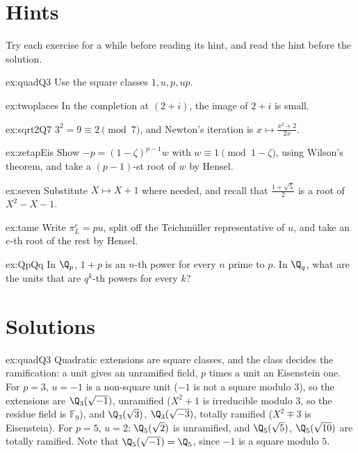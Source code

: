 \section{Hints}

Try each exercise for a while before reading its hint, and read the hint before the solution.

\begin{hint}{ex:quadQ3}
Use the square classes $1,u,p,up$.
\end{hint}
\begin{hint}{ex:twoplaces}
In the completion at $(2+i)$, the image of $2+i$ is small.
\end{hint}
\begin{hint}{ex:sqrt2Q7}
$3^2=9\equiv2\pmod 7$, and Newton's iteration is $x\mapsto\frac{x^2+2}{2x}$.
\end{hint}
\begin{hint}{ex:zetapEis}
Show $-p=(1-\zeta)^{p-1}w$ with $w\equiv1\pmod{1-\zeta}$, using Wilson's theorem, and take a $(p-1)$-st root of $w$ by Hensel.
\end{hint}
\begin{hint}{ex:seven}
Substitute $X\mapsto X+1$ where needed, and recall that $\frac{1+\sqrt5}2$ is a root of $X^2-X-1$.
\end{hint}
\begin{hint}{ex:tame}
Write $\pi_L^e=pu$, split off the Teichm\"uller representative of $u$, and take an $e$-th root of the rest by Hensel.
\end{hint}
\begin{hint}{ex:QpQq}
In $\Q_p$, $1+p$ is an $n$-th power for every $n$ prime to $p$. In $\Q_q$, what are the units that are $q^k$-th powers for every $k$?
\end{hint}

\section{Solutions}

\begin{solution}{ex:quadQ3}
\idea Quadratic extensions are square classes, and the class decides the ramification: a unit gives an unramified field,
$p$ times a unit an Eisenstein one.
\writeup For $p=3$, $u=-1$ is a non-square unit ($-1$ is not a square modulo $3$), so the extensions are $\Q_3(\sqrt{-1})$,
unramified ($X^2+1$ is irreducible modulo $3$, so the residue field is $\mathbb F_9$), and $\Q_3(\sqrt3)$, $\Q_3(\sqrt{-3})$, totally
ramified ($X^2\mp3$ is Eisenstein). For $p=5$, $u=2$: $\Q_5(\sqrt2)$ is unramified, and $\Q_5(\sqrt5)$, $\Q_5(\sqrt{10})$ are totally
ramified. Note that $\Q_5(\sqrt{-1})=\Q_5$, since $-1$ is a square modulo $5$.
\end{solution}

